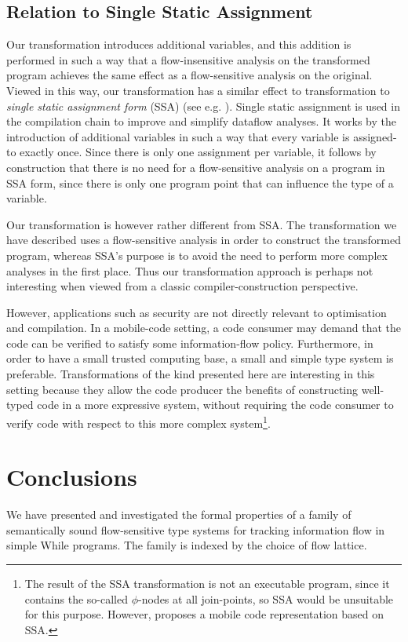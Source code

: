 \documentclass{sigplanconf}
\begin{document}
\subsection{Relation to Single Static Assignment}
\label{subsec:SSA}
Our transformation introduces additional variables, and this addition
is performed in such a way that a flow-insensitive analysis on the
transformed program achieves the same effect as a flow-sensitive
analysis on the original.
Viewed in this way, our transformation has a similar
effect to transformation to \emph{single static assignment form}
(SSA) (see e.g. \cite{Appel:Compilerbook}).  Single static assignment
is used in the compilation chain to improve and simplify dataflow
analyses. It works by the introduction of additional variables 
in such a way that every variable is assigned-to exactly once. 
Since there is only one assignment per variable, it follows by construction 
that there is no need for a flow-sensitive analysis on a program in SSA form,
since there is only one program point that can influence the type of a variable.

Our transformation is however rather different from SSA.  The
transformation we have described uses a flow-sensitive analysis in
order to construct the transformed program, whereas SSA's purpose is
to avoid the need to perform more complex analyses in the first place.
Thus our transformation approach is perhaps not interesting when
viewed from a classic compiler-construction perspective.

However, applications such as security are not directly
relevant to optimisation and compilation. In a mobile-code setting, a
code consumer may demand that the code can be verified to satisfy some
information-flow policy. Furthermore, in order to have a small trusted
computing base, a small and simple type system is preferable.
Transformations of the kind presented here are interesting in this
setting because they allow the code producer the benefits of
constructing well-typed code in a more expressive system, without
requiring the code consumer to verify code with respect to this more
complex system\footnote{The result of the SSA transformation is not an executable
program, since it contains the so-called $\phi$-nodes at all
join-points, so SSA would be unsuitable for this purpose.
However, \cite{Amme+:SafeTSA} proposes a mobile code representation based on SSA.}. 



\section{Conclusions}
We have presented and investigated the formal properties
of a family of semantically sound flow-sensitive type systems for 
tracking information flow in simple
While programs. The family is indexed by the choice
of flow lattice.
\end{document}
